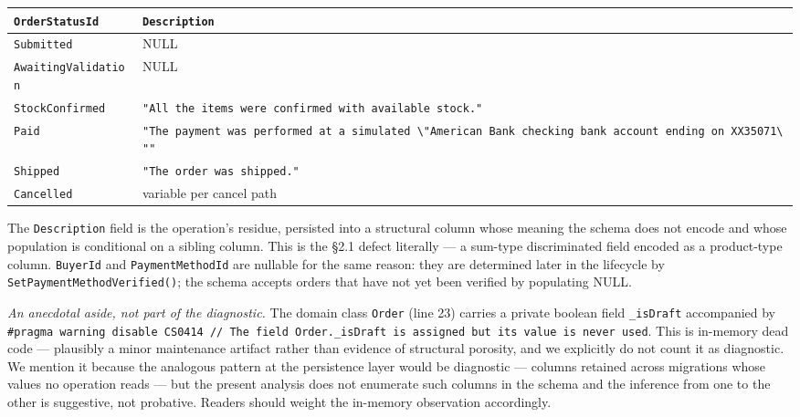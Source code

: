 \documentclass[
]{article}
\newcounter{none} %
\let\origtexttt\texttt%
\renewcommand{\texttt}[1]{\origtexttt{\seqsplit{#1}}}%
\let\texttt\origtexttt%
\begin{document}
{\def\LTcaptype{none} %
\begin{longtable}[]{@{}
  >{\raggedright\arraybackslash}p{}
  >{\raggedright\arraybackslash}p{}@{}}
\toprule\noalign{}
\begin{minipage}[b]{\linewidth}\raggedright
\texttt{OrderStatusId}
\end{minipage} & \begin{minipage}[b]{\linewidth}\raggedright
\texttt{Description}
\end{minipage} \\
\midrule\noalign{}
\endhead
\bottomrule\noalign{}
\endlastfoot
\texttt{Submitted} & NULL \\
\texttt{AwaitingValidation} & NULL \\
\texttt{StockConfirmed} &
\texttt{"All\ the\ items\ were\ confirmed\ with\ available\ stock."} \\
\texttt{Paid} &
\texttt{"The\ payment\ was\ performed\ at\ a\ simulated\ \textbackslash{}"American\ Bank\ checking\ bank\ account\ ending\ on\ XX35071\textbackslash{}""} \\
\texttt{Shipped} & \texttt{"The\ order\ was\ shipped."} \\
\texttt{Cancelled} & variable per cancel path \\
\end{longtable}
}

The \texttt{Description} field is the operation's residue, persisted
into a structural column whose meaning the schema does not encode and
whose population is conditional on a sibling column. This is the §2.1
defect literally --- a sum-type discriminated field encoded as a
product-type column. \texttt{BuyerId} and \texttt{PaymentMethodId} are
nullable for the same reason: they are determined later in the lifecycle
by \texttt{SetPaymentMethodVerified()}; the schema accepts orders that
have not yet been verified by populating NULL.

\emph{An anecdotal aside, not part of the diagnostic.} The domain class
\texttt{Order} (line 23) carries a private boolean field
\texttt{\_isDraft} accompanied by
\texttt{\#pragma\ warning\ disable\ CS0414\ //\ The\ field\ \textquotesingle{}Order.\_isDraft\textquotesingle{}\ is\ assigned\ but\ its\ value\ is\ never\ used}.
This is in-memory dead code --- plausibly a minor maintenance artifact
rather than evidence of structural porosity, and we explicitly do not
count it as diagnostic. We mention it because the analogous pattern at
the persistence layer would be diagnostic --- columns retained across
migrations whose values no operation reads --- but the present analysis
does not enumerate such columns in the schema and the inference from one
to the other is suggestive, not probative. Readers should weight the
in-memory observation accordingly.
\end{document}
